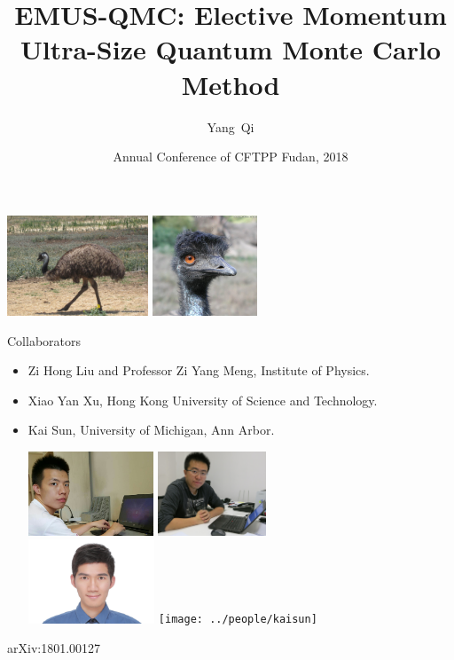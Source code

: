 \documentclass[xcolor=table, 10pt, aspectratio=43]{beamer}
\title[EQMC] %
{EMUS-QMC: Elective Momentum Ultra-Size Quantum Monte Carlo Method}
\author[Y Qi] %
{Yang~Qi}
\institute[Fudan] %
{
Department of Physics, Fudan University.
}
\date{Annual Conference of CFTPP Fudan, 2018}
\begin{document}
\begin{frame}
  \titlepage
  \begin{center}
    \includegraphics[height=3cm]{emu}
    \includegraphics[height=3cm]{emu2}
  \end{center}
\end{frame}

\begin{frame}{Collaborators}
\begin{itemize}
\item Zi Hong Liu and Professor Zi Yang Meng, Institute of Physics.
\item Xiao Yan Xu, Hong Kong University of Science and Technology.
\item Kai Sun, University of Michigan, Ann Arbor.
\begin{center}
  \includegraphics[height=2.5cm]{../people/zihongliu}
  \includegraphics[height=2.5cm]{../people/ziyangmeng}\\
  \includegraphics[height=2.5cm]{../people/xiaoyanxu}
  \texttt{[image: ../people/kaisun]}
\end{center}
\end{itemize}
\begin{center}
  \small arXiv:1801.00127
\end{center}
\end{frame}
\end{document}
